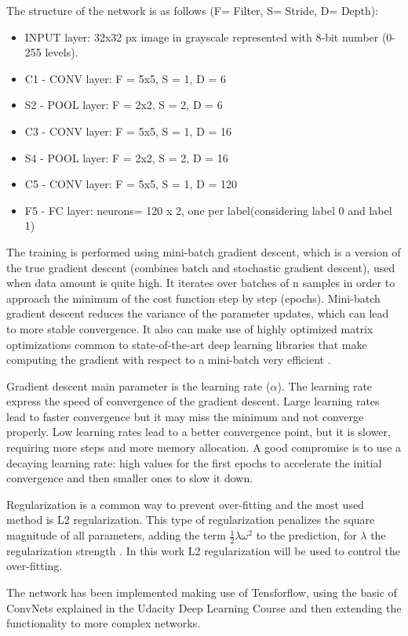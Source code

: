 \documentclass[]{article}
\begin{document}
The structure of the network is as follows (F= Filter, S= Stride, D= Depth):
\begin{itemize}
	\item INPUT layer: 32x32 px image in grayscale represented with 8-bit number (0-255 levels).
	\item C1 - CONV layer: F = 5x5, S = 1, D = 6
	\item S2 - POOL layer: F = 2x2, S = 2, D = 6
	\item C3 - CONV layer: F = 5x5, S = 1, D = 16
	\item S4 - POOL layer: F = 2x2, S = 2, D = 16
	\item C5 - CONV layer: F = 5x5, S = 1, D = 120
	\item F5 - FC layer: neurons= 120 x 2, one per label(considering label 0 and label 1)
\end{itemize}

The training is performed using mini-batch gradient descent, which is a version of the true gradient descent (combines batch and stochastic gradient descent), used when data amount is quite high. It iterates over batches of n samples in order to approach the minimum of the cost function step by step (epochs). Mini-batch gradient descent reduces the variance of the parameter updates, which can lead to more stable convergence. It also can make use of highly optimized matrix optimizations common to state-of-the-art deep learning libraries that make computing the gradient with respect to a mini-batch very efficient \cite{ruderweb}.

Gradient descent main parameter is the learning rate ($\alpha$). The learning rate express the speed of convergence of the gradient descent. Large learning rates lead to faster convergence but it may miss the minimum and not converge properly. Low learning rates lead to a better convergence point, but it is slower, requiring more steps and more memory allocation. A good compromise is to use a decaying learning rate: high values for the first epochs to accelerate the initial convergence and then smaller ones to slow it down. 

Regularization is a common way to prevent over-fitting and the most used method is L2 regularization. This type of regularization penalizes the square magnitude of all parameters, adding the term $\frac{1}{2}\lambda \omega ^2$ to the prediction, for $\lambda$ the regularization strength \cite{cs231convnets}. In this work L2 regularization will be used to control the over-fitting.

The network has been implemented making use of Tensforflow, using the basic of ConvNets explained in the Udacity Deep Learning Course \cite{deepgithub} and then extending the functionality to more complex networks.
\end{document}

